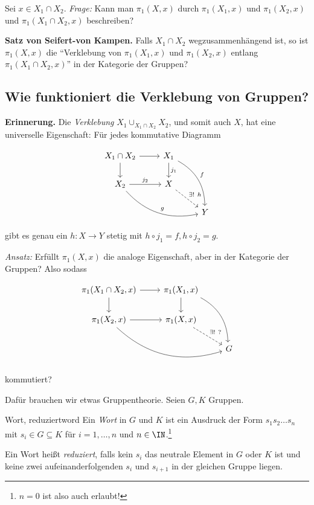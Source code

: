 \documentclass[language=ngerman]{TemplateLecture} %
\begin{document}
Sei $x \in X_1 \cap X_2$. \emph{Frage:} Kann man $\pi_1(X,x)$ durch $\pi_1(X_1,x)$ und $\pi_1(X_2,x)$ und $\pi_1(X_1 \cap X_2, x)$ beschreiben?

\textbf{Satz von Seifert-von Kampen.} Falls $X_1 \cap X_2$ wegzusammenhängend ist, so ist $\pi_1(X,x)$ die \enquote{Verklebung von $\pi_1(X_1,x)$ und $\pi_1(X_2, x)$ entlang $\pi_1(X_1 \cap X_2, x)$} in der Kategorie der Gruppen?

\subsection*{Wie funktioniert die Verklebung von Gruppen?}
\textbf{Erinnerung.} Die \emph{Verklebung} $X_1 \cup_{X_1 \cap X_2} X_2$, und somit auch $X$, hat eine universelle Eigenschaft: Für jedes kommutative Diagramm 

\begin{equation*}
    \begin{tikzcd}
        X_1 \cap X_2 \arrow[r] \arrow[d] & X_1 \arrow[d, "j_1"] \arrow[ddr, bend left, "f"] \\ 
        X_2 \arrow[r, "j_2"] \arrow[drr, bend right, "g"] & X \arrow[dr, dashed, "\exists!~ h"] \\
        & & Y  
    \end{tikzcd}
\end{equation*}

gibt es genau ein $h: X \to Y$ stetig mit $h \circ j_1 = f, h \circ j_2 = g$.

\emph{Ansatz:} Erfüllt $\pi_1(X,x)$ die analoge Eigenschaft, aber in der Kategorie der Gruppen? Also sodass 

\begin{equation*}
    \begin{tikzcd}
        \pi_1(X_1 \cap X_2, x) \arrow[r] \arrow[d] & \pi_1(X_1, x) \arrow[d] \arrow[ddr, bend left] \\ 
        \pi_1(X_2,x) \arrow[r] \arrow[drr, bend right] & \pi_1(X,x) \arrow[dr, dashed, "\exists!~ ?"] \\
        & & G  
    \end{tikzcd}
\end{equation*}

kommutiert?

Dafür brauchen wir etwas Gruppentheorie. Seien $G, K$ Gruppen.

\begin{defi}{Wort, reduziert}{word}
    Ein \emph{Wort} in $G$ und $K$ ist ein Ausdruck der Form $s_1 s_2 \ldots s_n$ mit $s_i \in G \subseteq K$ für $i = 1,\ldots,n$ und $n \in \IN$.\footnote{$n = 0$ ist also auch erlaubt!}

    Ein Wort heißt \emph{reduziert}, falls kein $s_i$ das neutrale Element in $G$ oder $K$ ist und keine zwei aufeinanderfolgenden $s_i$ und $s_{i+1}$ in der gleichen Gruppe liegen.
\end{defi}
\end{document}
